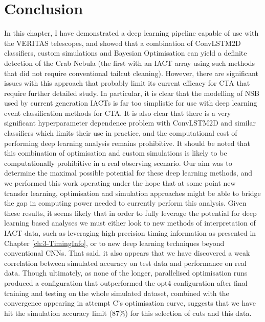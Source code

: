\section{Conclusion}
In this chapter, I have demonstrated a deep learning pipeline capable of use with the VERITAS telescopes, and showed that a combination of ConvLSTM2D classifiers, custom simulations and Bayesian Optimisation can yield a definite detection of the Crab Nebula (the first with an IACT array using such methods that did not require conventional tailcut cleaning). However, there are significant issues with this approach that probably limit its current efficacy for CTA that require further detailed study. In particular, it is clear that the modelling of NSB used by current generation IACTs is far too simplistic for use with deep learning event classification methods for CTA. It is also clear that there is a very significant hyperparameter dependence problem with ConvLSTM2D and similar classifiers which limits their use in practice, and the computational cost of performing deep learning analysis remains prohibitive. It should be noted that this combination of optimisation and custom simulations is likely to be computationally prohibitive in a real observing scenario. Our aim was to determine the maximal possible potential for these deep learning methods, and we performed this work operating under the hope that at some point new transfer learning, optimisation and simulation approaches might be able to bridge the gap in computing power needed to currently perform this analysis. Given these results, it seems likely that in order to fully leverage the potential for deep learning based analyses we must either look to new methods of interpretation of IACT data, such as leveraging high precision timing information as presented in Chapter \ref{ch:3-TimingInfo}, or to new deep learning techniques beyond conventional CNNs. That said, it also appears that we have discovered a weak correlation between simulated accuracy on test data and performance on real data.
Though ultimately, as none of the longer, parallelised optimisation runs produced a configuration that outperformed the opt4 configuration after final training and testing on the whole simulated dataset, combined with the convergence appearing in attempt C's optimisation curve, suggests that we have hit the simulation accuracy limit (87\%) for this selection of cuts and this data. 